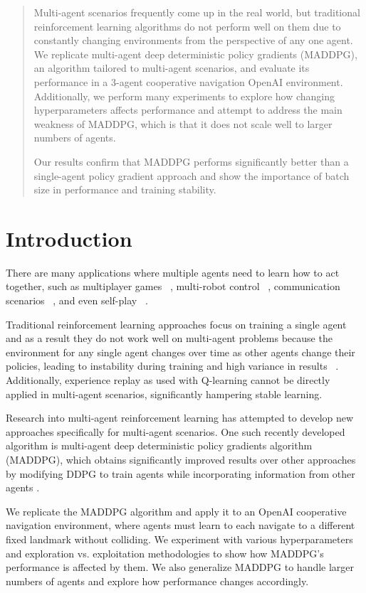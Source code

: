 \documentclass{article}
\begin{document}
\begin{abstract}
Multi-agent scenarios frequently come up in the real world, but traditional reinforcement learning algorithms do not perform well on them due to constantly changing environments from the perspective of any one agent. We replicate multi-agent deep deterministic policy gradients (MADDPG), an algorithm tailored to multi-agent scenarios, and evaluate its performance in a 3-agent cooperative navigation OpenAI environment. Additionally, we perform many experiments to explore how changing hyperparameters affects performance and attempt to address the main weakness of MADDPG, which is that it does not scale well to larger numbers of agents.

Our results confirm that MADDPG performs significantly better than a single-agent policy gradient approach and show the importance of batch size in performance and training stability.
\end{abstract}


\section{Introduction}
\label{submission}

There are many applications where multiple agents need to learn how to act together, such as multiplayer games ~\cite{multigames}, multi-robot control ~\cite{multirobot}, communication scenarios ~\cite{communication}, and even self-play ~\cite{selfplay}.

Traditional reinforcement learning approaches focus on training a single agent and as a result they do not work well on multi-agent problems because the environment for any single agent changes over time as other agents change their policies, leading to instability during training and high variance in results ~\cite{unstable}. Additionally, experience replay as used with Q-learning cannot be directly applied in multi-agent scenarios, significantly hampering stable learning.

Research into multi-agent reinforcement learning has attempted to develop new approaches specifically for multi-agent scenarios. One such recently developed algorithm is multi-agent deep deterministic policy gradients algorithm (MADDPG), which obtains significantly improved results over other approaches by modifying DDPG to train agents while incorporating information from other agents \cite{maddpg}.

We replicate the MADDPG algorithm and apply it to an OpenAI cooperative navigation environment, where agents must learn to each navigate to a different fixed landmark without colliding. We experiment with various hyperparameters and exploration vs. exploitation methodologies to show how MADDPG's performance is affected by them. We also generalize MADDPG to handle larger numbers of agents and explore how performance changes accordingly.
\end{document}
